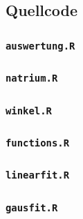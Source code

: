 \documentclass[12pt,listof=totoc]{scrartcl}
\newcommand{\code}[1]{\texttt{#1}}
\begin{document}



%
\newpage


\subsection{Quellcode}
\label{sourcecode}
\subsubsection{\code{auswertung.R}}\label{auswertungR}

\subsubsection{\code{natrium.R}}\label{natriumR}

\subsubsection{\code{winkel.R}}\label{winkelR}

\subsubsection{\code{functions.R}}\label{functionsR}

\subsubsection{\code{linearfit.R}}\label{linearfitR}

\subsubsection{\code{gausfit.R}}\label{gausfitR}



\newpage
\end{document}
